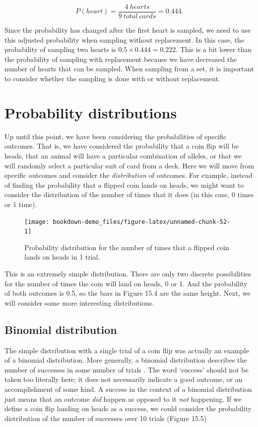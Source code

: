 \documentclass[
  openany]{krantz}
\begin{document}
\[P(heart) = \frac{4\:hearts}{9\:total\:cards} = 0.444.\]

Since the probability has changed after the first heart is sampled, we need to use this adjusted probability when sampling without replacement.
In this case, the probability of sampling two hearts is \(0.5 \times 0.444 = 0.222\).
This is a bit lower than the probability of sampling with replacement because we have decreased the number of hearts that can be sampled.
When sampling from a set, it is important to consider whether the sampling is done with or without replacement.

\hypertarget{probability-distributions}{%
\section{Probability distributions}\label{probability-distributions}}

Up until this point, we have been considering the probabilities of specific outcomes.
That is, we have considered the probability that a coin flip will be heads, that an animal will have a particular combination of alleles, or that we will randomly select a particular suit of card from a deck.
Here we will move from specific outcomes and consider the \emph{distribution} of outcomes.
For example, instead of finding the probability that a flipped coin lands on heads, we might want to consider the distribution of the number of times that it does (in this case, 0 times or 1 time).

\begin{figure}
\texttt{[image: bookdown-demo\_files/figure-latex/unnamed-chunk-52-1]} \caption{Probability distribution for the number of times that a flipped coin lands on heads in 1 trial.}\label{fig:unnamed-chunk-52}
\end{figure}

This is an extremely simple distribution.
There are only two discrete possibilities for the number of times the coin will land on heads, 0 or 1.
And the probability of both outcomes is 0.5, so the bars in Figure 15.4 are the same height.
Next, we will consider some more interesting distributions.

\hypertarget{binomial-distribution}{%
\subsection{Binomial distribution}\label{binomial-distribution}}

The simple distribution with a single trial of a coin flip was actually an example of a binomial distribution.
More generally, a binomial distribution describes the number of successes in some number of trials \citep{Miller2004}.
The word `success' should not be taken too literally here; it does not necessarily indicate a good outcome, or an accomplishment of some kind.
A success in the context of a binomial distribution just means that an outcome \emph{did} happen as opposed to it \emph{not} happening.
If we define a coin flip landing on heads as a success, we could consider the probability distribution of the number of successes over 10 trials (Figure 15.5)
\end{document}
